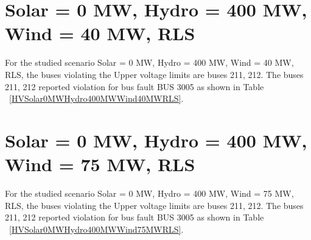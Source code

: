\documentclass[10pt]{report}
\begin{document}
\section{Solar = 0 MW, Hydro = 400 MW, Wind = 40 MW, RLS}
For the studied scenario Solar = 0 MW, Hydro = 400 MW, Wind = 40 MW, RLS, the buses violating the Upper voltage limits are buses 211, 212.
The buses 211, 212 reported violation for bus fault BUS 3005 as shown in Table ~\ref{HVSolar0MWHydro400MWWind40MWRLS}.
\begin{table}[H]
\caption{Contingencies reporting bus voltages greater than emergency voltage of 1.1 PU for scenario Solar = 0 MW, Hydro = 400 MW, Wind = 40 MW, RLS}
\label{HVSolar0MWHydro400MWWind40MWRLS}
\centering
{}
\end{table}


\section{Solar = 0 MW, Hydro = 400 MW, Wind = 75 MW, RLS}
For the studied scenario Solar = 0 MW, Hydro = 400 MW, Wind = 75 MW, RLS, the buses violating the Upper voltage limits are buses 211, 212.
The buses 211, 212 reported violation for bus fault BUS 3005 as shown in Table ~\ref{HVSolar0MWHydro400MWWind75MWRLS}.
\begin{table}[H]
\caption{Contingencies reporting bus voltages greater than emergency voltage of 1.1 PU for scenario Solar = 0 MW, Hydro = 400 MW, Wind = 75 MW, RLS}
\label{HVSolar0MWHydro400MWWind75MWRLS}
\centering
{}
\end{table}
\end{document}
